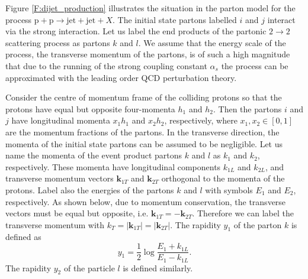 \documentclass[a4paper, twoside, english, 12pt]{report}
\begin{document}
Figure \ref{F:dijet_production} illustrates the situation in the parton model for the process $\text{p}+\text{p}\rightarrow\text{jet}+\text{jet}+X$. The initial state partons labelled $i$ and $j$ interact via the strong interaction. Let us label the end products of the partonic $2\rightarrow2$ scattering process as partons $k$ and $l$. We assume that the energy scale of the process, the transverse momentum of the partons, is of such a high magnitude that due to the running of the strong coupling constant $\alpha_s$ the process can be approximated with the leading order QCD perturbation theory.

Consider the centre of momentum frame of the colliding protons so that the protons have equal but opposite four-momenta $h_1$ and $h_2$. Then the partons $i$ and $j$ have longitudinal momenta $x_1h_1$ and $x_2h_2$, respectively, where $x_1,x_2\in {[0,1]}$ are the momentum fractions of the partons. In the transverse direction, the momenta of the initial state partons can be assumed to be negligible. Let us name the momenta of the event product partons $k$ and $l$ as $k_1$ and $k_2$, respectively. These momenta have longitudinal components $k_{1L}$ and $k_{2L}$, and transverse momentum vectors $\mathbf{k}_{1T}$ and $\mathbf{k}_{2T}$ orthogonal to the momenta of the protons. Label also the energies of the partons $k$ and $l$ with symbols $E_1$ and $E_2$, respectively. As shown below, due to momentum conservation, the transverse vectors must be equal but opposite, i.e. $\mathbf{k}_{1T}=-\mathbf{k}_{2T}$. Therefore we can label the transverse momentum with  $k_{T}=|\mathbf{k}_{1T}|=|\mathbf{k}_{2T}|$. The rapidity $y_1$ of the parton $k$ is defined as
\begin{equation}\label{E:rapidity}
y_1=\frac{1}{2}\log\frac{E_1+k_{1L}}{E_1-k_{1L}}.
\end{equation}
The rapidity $y_2$ of the particle $l$ is defined similarly.
\end{document}
